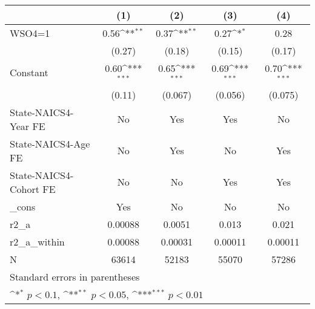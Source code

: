 {
\def\sym#1{\ifmmode^{#1}\else\(^{#1}\)\fi}
\begin{tabular}{l*{4}{c}}
\hline\hline
                    &\multicolumn{1}{c}{(1)}         &\multicolumn{1}{c}{(2)}         &\multicolumn{1}{c}{(3)}         &\multicolumn{1}{c}{(4)}         \\
\hline
WSO4=1              &        0.56\sym{**} &        0.37\sym{**} &        0.27\sym{*}  &        0.28         \\
                    &      (0.27)         &      (0.18)         &      (0.15)         &      (0.17)         \\
[1em]
Constant            &        0.60\sym{***}&        0.65\sym{***}&        0.69\sym{***}&        0.70\sym{***}\\
                    &      (0.11)         &     (0.067)         &     (0.056)         &     (0.075)         \\
[1em]
State-NAICS4-Year FE&          No         &         Yes         &         Yes         &          No         \\
[1em]
State-NAICS4-Age FE &          No         &         Yes         &          No         &         Yes         \\
[1em]
State-NAICS4-Cohort FE&          No         &          No         &         Yes         &         Yes         \\
[1em]
\_cons              &         Yes         &          No         &          No         &          No         \\
\hline
r2\_a                &     0.00088         &      0.0051         &       0.013         &       0.021         \\
r2\_a\_within         &     0.00088         &     0.00031         &     0.00011         &     0.00011         \\
N                   &       63614         &       52183         &       55070         &       57286         \\
\hline\hline
\multicolumn{5}{l}{\footnotesize Standard errors in parentheses}\\
\multicolumn{5}{l}{\footnotesize \sym{*} \(p<0.1\), \sym{**} \(p<0.05\), \sym{***} \(p<0.01\)}\\
\end{tabular}
}
